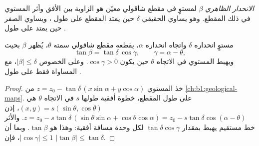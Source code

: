 \begin{definition}\label{def:b1:cross-sections:apparent-dip}
\emph{الانحدار الظاهري} $\beta$ لمستوٍ في مقطع شاقولي معيّن هو الزاوية بين الأفق وأثر المستوي في ذلك المقطع. وهو يساوي  الحقيقي $\delta$ حين يمتد المقطع على طول ، ويساوي الصفر حين يمتد على طول .
\end{definition}

\begin{theorem}\label{thm:b1:cross-sections:apparent-dip}
مستوٍ انحداره $\delta$ واتجاه انحداره $\alpha$، يقطعه مقطع شاقولي سمته $\theta$، يُظهر  $\beta$ بحيث
\[
  \tan\beta = \tan\delta\,\cos\gamma, \qquad \gamma = \alpha - \theta ,
\]
ويهبط المستوي في الاتجاه $\theta$ حين يكون $\cos\gamma > 0$.
وعلى الخصوص $|\beta| \le \delta$، مع المساواة فقط على طول .
\end{theorem}

\begin{proof}
خذ المستوي $z = z_0 - \tan\delta\,(x\sin\alpha + y\cos\alpha)$ من
\cref{ch:b1:geological-maps}. على طول المقطع، خطوة أفقية طولها $s$ في الاتجاه $\theta$ هي $(x, y) = s(\sin\theta, \cos\theta)$، إذن
$z = z_0 - s\tan\delta\,(\sin\theta\sin\alpha + \cos\theta\cos\alpha) =
z_0 - s\tan\delta\cos(\alpha - \theta)$. والأثر خط مستقيم يهبط بمقدار $\tan\delta\cos\gamma$ لكل وحدة مسافة أفقية: وهذا هو
$\tan\beta$. وبما أن $|\cos\gamma| \le 1$، فإن $|\tan\beta| \le \tan\delta$.
\end{proof}

